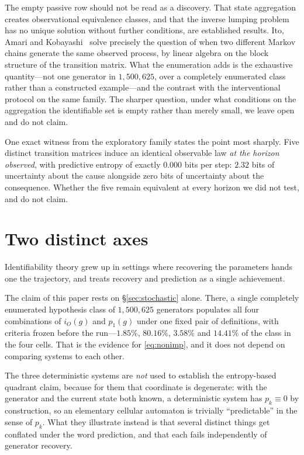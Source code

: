 \documentclass[11pt]{article}
\begin{document}
The empty passive row should not be read as a discovery. That state aggregation creates
observational equivalence classes, and that the inverse lumping problem has no unique
solution without further conditions, are established results. Ito, Amari and
Kobayashi~\cite{ito1992} solve precisely the question of when two different Markov chains
generate the same observed process, by linear algebra on the block structure of the
transition matrix. What the enumeration adds is the exhaustive
quantity---not one generator in $1{,}500{,}625$, over a completely enumerated class rather
than a constructed example---and the contrast with the interventional protocol on the same
family. The sharper question, under what conditions on the aggregation the identifiable
set is empty rather than merely small, we leave open and do not claim.

One exact witness from the exploratory family states the point most sharply. Five
distinct transition matrices induce an identical observable law \emph{at the horizon
observed}, with predictive entropy of exactly $0.000$ bits per step: $2.32$ bits of
uncertainty about the cause alongside zero bits of uncertainty about the consequence.
Whether the five remain equivalent at every horizon we did not test, and do not claim.

\section{Two distinct axes}\label{sec:quadrants}

Identifiability theory grew up in settings where recovering the parameters hands one
the trajectory, and treats recovery and prediction as a single achievement.

The claim of this paper rests on \S\ref{sec:stochastic} alone. There, a single completely
enumerated hypothesis class of $1{,}500{,}625$ generators populates all four combinations
of $i_O(g)$ and $p_1(g)$ under one fixed pair of definitions, with criteria frozen before
the run---$1.85\%$, $80.16\%$, $3.58\%$ and $14.41\%$ of the class in the four cells. That
is the evidence for \eqref{eq:nonimp}, and it does not depend on comparing systems to each
other.

The three deterministic systems are \emph{not} used to establish the entropy-based
quadrant claim, because for them that coordinate is degenerate: with the generator and the
current state both known, a deterministic system has $p_k \equiv 0$ by construction, so an
elementary cellular automaton is trivially ``predictable'' in the sense of $p_k$. What they
illustrate instead is that several distinct things get conflated under the word
prediction, and that each fails independently of generator recovery.
\end{document}
